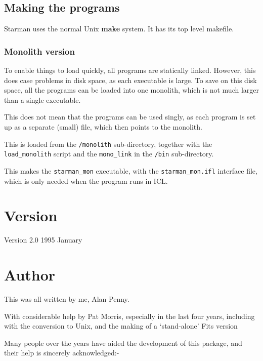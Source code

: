 \subsection{Making the programs}

Starman uses the normal Unix {\bf make} system. It has its top level
makefile.

\subsubsection{Monolith version}

To enable things to load quickly, all programs are statically linked.
However, this does case problems in disk space, as each executable is
large.  To save on this disk space, all the programs can be loaded into
one monolith, which is not much larger than a single executable.

This does not mean that the programs can be used singly, as each
program is set up as a separate (small) file, which then points to the
monolith.

This is loaded from the \verb|/monolith| sub-directory, together with
the \verb|load_monolith| script and the \verb|mono_link| in the
\verb|/bin| sub-directory.

This makes the \verb|starman_mon| executable, with the
\verb|starman_mon.ifl| interface file, which is only needed when the
program runs in ICL.






\section{Version} 

  Version 2.0       \hspace*{20mm} 1995 January


\section{Author} 

  This was all written by me, Alan Penny.

  With considerable help by Pat Morris, especially in the last four
  years, including with the conversion to Unix, and the making of a
  `stand-alone' Fits version

  Many people over the years have aided the development of this package,
  and their help is sincerely acknowledged:-

